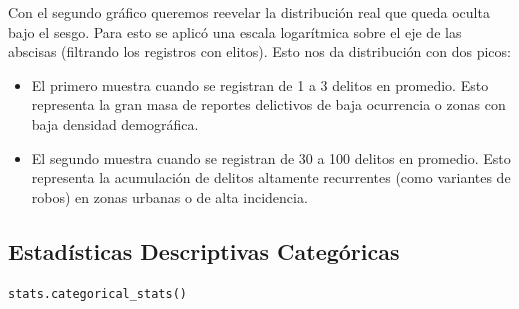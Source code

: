 Con el segundo gráfico queremos reevelar la distribución real que queda oculta bajo el sesgo. Para esto se aplicó una escala logarítmica
sobre el eje de las abscisas (filtrando los registros con elitos). Esto nos da distribución con dos picos:

\begin{itemize}
  \item El primero muestra cuando se registran de 1 a 3 delitos en promedio. Esto representa la gran masa de reportes delictivos de baja
ocurrencia o zonas con baja densidad demográfica.
  \item El segundo muestra cuando se registran de 30 a 100 delitos en promedio. Esto representa la acumulación de delitos altamente recurrentes
(como variantes de robos) en zonas urbanas o de alta incidencia.
\end{itemize}

\subsection{Estadísticas Descriptivas Categóricas}

\begin{lstlisting}[language=Python, caption={Código para obtener estadísticas descriptivas categóricas}, label={lst:stats-descriptivas-categoricas}]
	stats.categorical_stats()
\end{lstlisting}

\begin{table}[ht]
  \centering
  \caption{Estadísticas Descriptivas Categóricas}
  \scriptsize
  \label{tab:categorical-stats}
\end{table}

